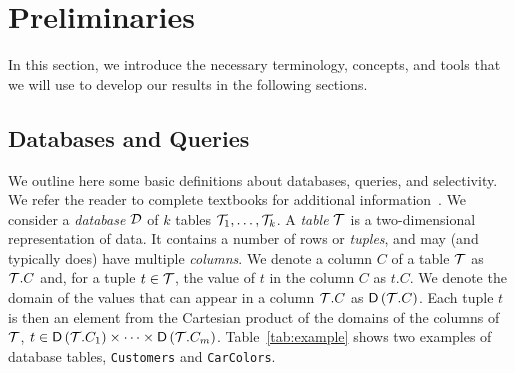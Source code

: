 \section{Preliminaries}\label{sec:prelims}
In this section, we introduce the necessary terminology, concepts, and tools
that we will use to develop our results in the following sections.

\subsection{Databases and Queries}\label{sec:dbqueries}
We outline here some basic definitions about databases, queries, and
selectivity. We refer the reader to complete textbooks for additional
information~\citep{GarciaMolinaUW02}.
We consider a \emph{database} ${\cal D}$ of $k$ tables ${\cal T}_1,\dotsc,{\cal T}_k$. 
A \emph{table} ${\cal T}$ is a two-dimensional representation of data. It
contains a number of rows or \emph{tuples}, and may (and typically does) have multiple
\emph{columns}. We denote a column $C$ of a table ${\cal T}$ as ${\cal T}.C$ and, for a
tuple $t\in{\cal T}$, the value of $t$ in the column $C$ as $t.C$. We denote the
domain of the values that can appear in a column ${\cal T}.C$ as $\mathsf{D}\left({\cal T}.C\right)$.
Each tuple $t$ is then an element from the Cartesian product of the domains of
the columns of ${\cal T}$, $t\in \mathsf{D}\left({\cal T}.C_1\right)\times\dotsb\times
\mathsf{D}\left({\cal T}.C_m\right)$. Table~\ref{tab:example} shows two examples of database
tables, \texttt{Customers} and \texttt{CarColors}. 

